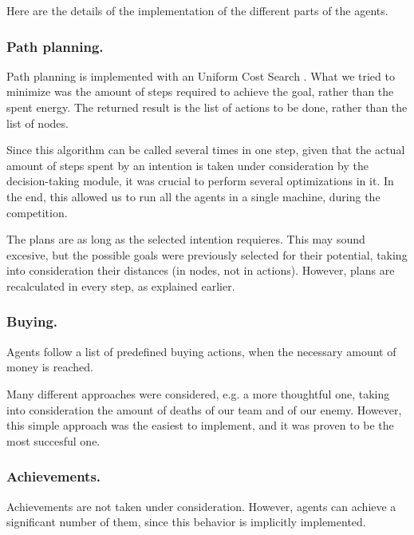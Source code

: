 \documentclass{llncs2e/llncs}
\begin{document}
    Here are the details of the implementation of the different parts of the
    agents.

\subsubsection{Path planning.}

    Path planning is implemented with an Uniform Cost Search 
    \cite{Russell:2003:AIM:773294}. 
    What we tried to minimize was the amount of steps required to achieve the 
    goal, rather than the spent energy. 
    The returned result is the list of actions to be done, rather than the list of 
    nodes.
    
    Since this algorithm can be called several times in one step, given that the 
    actual amount of steps spent by an intention is taken under consideration by 
    the decision-taking module, it was crucial to perform several optimizations in 
    it. In the end, this allowed us to run all the agents in a single machine, 
    during the competition.
    
    The plans are as long as the selected intention requieres. This may 
    sound excesive, but the possible goals were previously selected for their 
    potential, taking into consideration their distances (in nodes, not in 
    actions). However, plans are recalculated in every step, as explained earlier.


\subsubsection{Buying.}

    Agents follow a list of predefined buying actions, when the necessary amount 
    of money is reached.
    
    Many different approaches were considered, e.g. a more thoughtful one, taking
    into consideration the amount of deaths of our team and of our enemy.
    However, this simple approach was the easiest to implement, and it was
    proven to be the most succesful one.

\subsubsection{Achievements.}
    Achievements are not taken under consideration. However, agents can
    achieve a significant number of them, since this behavior is implicitly 
    implemented.

    
\end{document}
